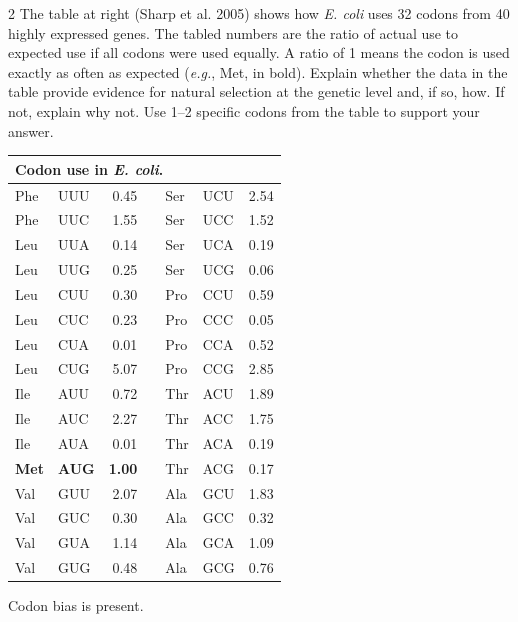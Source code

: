 \question[15]

\begin{multicols}{2}
\flushleft
The table at right (Sharp et al. 2005) shows how \textit{E. coli} uses 32 codons from 40 highly expressed genes. The tabled numbers are the ratio of actual use to expected use if all codons were used equally. A ratio of 1 means the codon is used exactly as often as expected (\textit{e.g.}, Met, in bold). Explain whether the data in the table provide evidence for natural selection at the genetic level and, if so, how. If not, explain why not. Use 1--2 specific codons from the table to support your answer.
\columnbreak
\begin{tabular}{@{}llrcllr@{}}
	\toprule
	\multicolumn{7}{l}{Codon use in \textit{E. coli}.}\\
	\midrule
	Phe & UUU & 0.45 &  & Ser & UCU & 2.54\\
Phe & UUC & 1.55 &  & Ser & UCC & 1.52\\
Leu & UUA & 0.14 &  & Ser & UCA & 0.19\\
Leu & UUG & 0.25 &  & Ser & UCG & 0.06\\
Leu & CUU & 0.30 &  & Pro & CCU & 0.59\\
Leu & CUC & 0.23 &  & Pro & CCC & 0.05\\
Leu & CUA & 0.01 &  & Pro & CCA & 0.52\\
Leu & CUG & 5.07 &  & Pro & CCG & 2.85\\
Ile & AUU & 0.72 &  & Thr & ACU & 1.89\\
Ile & AUC & 2.27 &  & Thr & ACC & 1.75\\
Ile & AUA & 0.01 &  & Thr & ACA & 0.19\\
\textbf{Met} & \textbf{AUG} & \textbf{1.00} &  & Thr & ACG & 0.17\\
Val & GUU & 2.07 &  & Ala & GCU & 1.83\\
Val & GUC & 0.30 &  & Ala & GCC & 0.32\\
Val & GUA & 1.14 &  & Ala & GCA & 1.09\\
Val & GUG & 0.48 &  & Ala & GCG & 0.76\\
	\bottomrule
	\end{tabular}
\end{multicols}
	\begin{solution}
	Codon bias is present.
	\end{solution}

